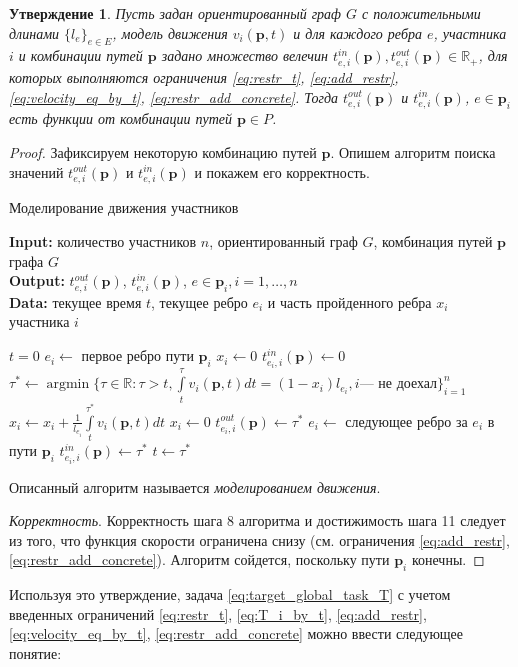 \documentclass[12pt, a4paper]{article}
\DeclareMathOperator*{\argmin}{argmin}
\newtheorem{state}{Утверждение}[section]
\begin{document}
\begin{state}
\label{state:modeling}
Пусть задан ориентированный граф $G$ с положительными длинами $\{l_e\}_{e \in E}$, модель движения $v_i(\textbf{p}, t)$ и для каждого ребра $e$, участника $i$ и комбинации путей $\textbf{p}$ задано множество велечин $t_{e, i}^{in}(\textbf{p}), t_{e, i}^{out}(\textbf{p}) \in \mathbb{R}_+$, для которых выполняются ограничения \eqref{eq:restr_t}, \eqref{eq:add_restr}, \eqref{eq:velocity_eq_by_t}, \eqref{eq:restr_add_concrete}. Тогда $t_{e, i}^{out}(\textbf{p})$ и $t_{e, i}^{in}(\textbf{p})$, $e \in \textbf{p}_i$ есть функции от комбинации путей $\textbf{p} \in P$.
\end{state}
\begin{proof}
Зафиксируем некоторую комбинацию путей $\textbf{p}$. Опишем алгоритм поиска значений $t_{e, i}^{out}(\textbf{p})$ и $t_{e, i}^{in}(\textbf{p})$ и покажем его корректность.

\begin{algorithm}[!hpt]
	\caption{Моделирование движения участников}
	\label{alg:modeling}
	{\bf {Input:}} количество участников $n$, ориентированный граф $G$, комбинация путей $\textbf{p}$ графа $G$\\
	{\bf {Output:}} $t_{e, i}^{out}(\textbf{p})$, $t_{e, i}^{in}(\textbf{p})$, $e \in \textbf{p}_i, i = 1, \ldots, n$\\
	{\bf {Data:}} текущее время $t$, текущее ребро $e_i$ и часть пройденного ребра $x_i$ участника $i$
	\begin{algorithmic}[1]
		\State $t = 0$
		\State $e_i \gets$ { первое ребро пути $\textbf{p}_i$}
		\State $x_i \gets 0$
		\State $t_{e_i, i}^{in}(\textbf{p}) \gets 0$ 
		\EndFor
		\State $\tau^* \gets \argmin\{ \tau \in \mathbb{R}: \tau > t, \int\limits_{t}^{\tau} v_i(\textbf{p}, t) dt = (1 - x_i) l_{e_i}, i \text{--- не доехал}  \}_{i = 1}^n$
		\State $x_i \gets x_i + \frac{1}{l_{e_i}} \int\limits_{t}^{\tau^*} v_i(\textbf{p}, t) dt$
				\State $x_i \gets 0$
				\State $t_{e_i, i}^{out}(\textbf{p}) \gets \tau^*$ 
				\State $e_i \gets$ следующее ребро за $e_i$ в пути $\textbf{p}_i$
				\State $t_{e_i, i}^{in}(\textbf{p}) \gets \tau^*$ 
			\EndIf
		\EndFor
		\State $t \gets \tau^*$
		\EndWhile
	\end{algorithmic}
\end{algorithm}

Описанный алгоритм называется \textit{моделированием движения}.

\textit{Корректность}. Корректность шага 8 алгоритма и достижимость шага 11 следует из того, что функция скорости ограничена снизу (см. ограничения \eqref{eq:add_restr}, \eqref{eq:restr_add_concrete}). Алгоритм сойдется, поскольку пути $\textbf{p}_i$ конечны.

\end{proof}
 Используя это утверждение, задача \eqref{eq:target_global_task_T} с учетом введенных ограничений \eqref{eq:restr_t}, \eqref{eq:T_i_by_t}, \eqref{eq:add_restr}, \eqref{eq:velocity_eq_by_t}, \eqref{eq:restr_add_concrete} можно ввести следующее понятие:
\end{document}
